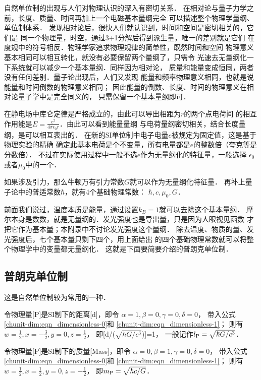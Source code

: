 自然单位制的出现与人们对物理认识的深入有密切关系．
在相对论与量子力学之前，长度、质量、时间再加上一个电磁基本量纲完全
可以描述整个物理学量纲、单位制体系．
发现相对论后，很快人们就认识到，时间和空间是密切相关的，它们是
同一个物理量，时空，通过3+1分解后得到派生量，唯一的差别就是它们
在度规中的符号相反．物理学家追求物理规律的简单性，既然时间和空间
物理意义基本相同可以相互转化，就没有必要保留两个量纲了，只需令
光速去无量纲化一下系统就可以减少一个基本量纲．同样因为相对论，
质量和能量变成恒同，两者没有任何差别．量子论出现后，人们又发现
能量和频率物理意义相同，也就是说能量和时间倒数的物理意义相同；
因此能量的倒数、长度、时间的物理意义在相对论量子学中是完全同义的，
只需保留一个基本量纲即可．

在静电场中库仑定律是严格成立的，由此可以导出相距为$r$的两个点电荷间
的相互作用能是$E=\frac{e^2}{4\pi\epsilon_0 r}$．由此可以看到能量量纲
与电荷量纲密切相关，结合长度量纲，是可以相互表出的．
在新的SI单位制中电子电量$e$被规定为固定值，这是基于物理实验的精确
确定此基本电荷是个不变量，所有电量都是$e$的整数倍（夸克等是分数倍）．
不过在实际使用过程中一般不选$e$作为无量纲化的特征量，一般选择
$\epsilon_0$或者$\mu_0$中的一个．

如果涉及引力，那么牛顿万有引力常数$G$就可以作为无量纲化特征量．
再补上量子论中的普适常数$\hbar$，就有4个基础物理常数：
$\hbar,c,\mu_0,G$．

前面我们说过，温度本质是能量，通过设置$k_B=1$就可以去除这个基本量纲．
摩尔本身是数数，就是无量纲的．发光强度也是导出量，只是因为人眼视见函数
才把它作为基本量；本附录中不讨论发光强度这个量纲．
除去温度、物质的量、发光强度后，七个基本量只剩下四个，用上面给出
的四个基础物理常数就可以将整个物理学中的变量都无量纲化．
这就是下面要简要介绍的{\kaishu 普朗克单位制}．

\subsection{普朗克单位制}
这是自然单位制较为常用的一种．

令物理量[\si{P}]是SI制下的距离[\si{d}]，即令
$\alpha=1,\beta=0,\gamma=0,\delta=0$，
带入公式\eqref{chunit-dim:eqn_dimensionless-0}和
\eqref{chunit-dim:eqn_dimensionless-1}；
则有$w=\frac{1}{2},x=-\frac{3}{2},y=0,z=\frac{1}{2}$，
即[\si{d}/($\sqrt{\hbar G/c^3}$)]=\num{1}，
一般记作$l_{\rm P}=\sqrt{\hbar G/c^3}$．

令物理量[\si{P}]是SI制下的质量[\si{Mass}]，即令
$\alpha=0,\beta=1,\gamma=0,\delta=0$，
带入公式\eqref{chunit-dim:eqn_dimensionless-0}和
\eqref{chunit-dim:eqn_dimensionless-1}；
则有$w=\frac{1}{2},x=\frac{1}{2},y=0,z=-\frac{1}{2}$，
即$m_{\rm P}=\sqrt{\hbar c/G}$．

